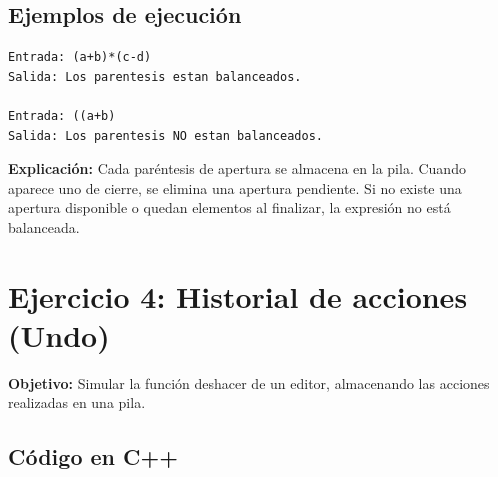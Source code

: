 \documentclass[12pt,a4paper]{article}
\begin{document}
\subsection*{Ejemplos de ejecución}

\begin{verbatim}
Entrada: (a+b)*(c-d)
Salida: Los parentesis estan balanceados.

Entrada: ((a+b)
Salida: Los parentesis NO estan balanceados.
\end{verbatim}

\textbf{Explicación:} Cada paréntesis de apertura se
almacena en la pila. Cuando aparece uno de cierre,
se elimina una apertura pendiente. Si no existe una
apertura disponible o quedan elementos al finalizar,
la expresión no está balanceada.

\section{Ejercicio 4: Historial de acciones (Undo)}

\textbf{Objetivo:} Simular la función deshacer de un editor,
almacenando las acciones realizadas en una pila.

\subsection*{Código en C++}
\end{document}
